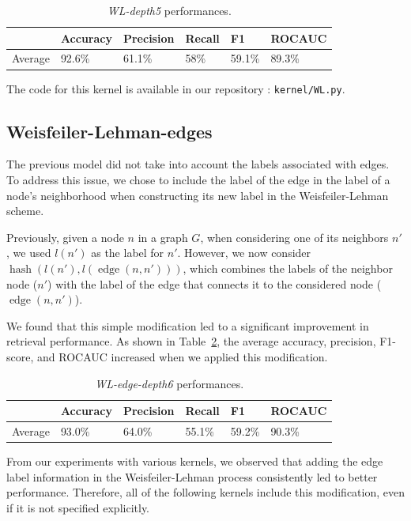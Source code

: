 \documentclass{IEEEtran}
\begin{document}
\begin{table}[h]
    \centering
    \begin{tabular}{l|llll|l}
                & Accuracy & Precision & Recall & F1     & ROCAUC \\
        \hline
        Average & 92.6\%   & 61.1\%    & 58\%   & 59.1\% & 89.3\% \\
    \end{tabular}
    \caption{\emph{WL-depth5} performances.}
    \label{tab:wldepth5}
\end{table}

The code for this kernel is available in our repository : \texttt{kernel/WL.py}.

\subsection{Weisfeiler-Lehman-edges}
The previous model did not take into account the labels associated with edges. To address this issue, we chose to include the label of the edge in the label of a node's neighborhood when constructing its new label in the Weisfeiler-Lehman scheme.

Previously, given a node $n$ in a graph $G$, when considering one of its neighbors $n'$, we used $l(n')$ as the label for $n'$. However, we now consider $\operatorname*{hash}(l(n'), l(\operatorname{edge}(n, n')))$,
which combines the labels of the neighbor node ($n'$) with the label of the edge that connects it to the considered node ($\operatorname{edge}(n, n')$).

We found that this simple modification led to a significant improvement in retrieval performance.
As shown in Table~\ref{tab:wldepth6edge}, the average accuracy, precision, F1-score, and ROCAUC increased when we applied this modification.


\begin{table}[h]
    \centering
    \begin{tabular}{l|llll|l}
                & Accuracy & Precision & Recall & F1     & ROCAUC \\
        \hline
        Average & 93.0\%   & 64.0\%    & 55.1\% & 59.2\% & 90.3\% \\
    \end{tabular}
    \caption{\emph{WL-edge-depth6} performances.}
    \label{tab:wldepth6edge}
\end{table}

From our experiments with various kernels, we observed that adding the edge label information in the Weisfeiler-Lehman process consistently led to better performance. Therefore, all of the following kernels include this modification, even if it is not specified explicitly.
\end{document}
